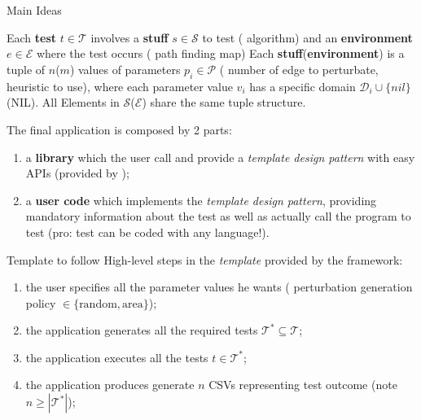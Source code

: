 \section*{}

\begin{frame}{Main Ideas}
    \begin{block}{\phantom{}}
    Each \textbf{test} $t \in \mathcal{T}$ involves a \textbf{stuff} $s \in \mathcal{S}$ to test (\eg{} algorithm) and an \textbf{environment} $e \in \mathcal{E}$ where the test occurs (\eg{} path finding map) Each \textbf{stuff}(\textbf{environment}) is a tuple of $n$($m$) values of parameters $p_i \in \mathcal{P}$ (\eg{} number of edge to perturbate, heuristic to use), where each parameter value $v_i$ has a specific domain $\mathcal{D}_{i} \cup \{nil \}$ (NIL). All Elements in $\mathcal{S}$($\mathcal{E}$) share the same tuple structure.
    \end{block}
    \vspace{-5pt}
    \begin{block}{\phantom{}}
        The final application is composed by 2 parts:
        \begin{enumerate}
            \item a \textbf{library} which the user call and provide a \textit{template design pattern} with easy APIs (provided by );
            \item a \textbf{user code} which implements the \textit{template design pattern}, providing mandatory information about the test as well as actually call the program to test (pro: test can be coded with any language!).
        \end{enumerate}
    \end{block}
    
\end{frame}

\begin{frame}{Template to follow}
    High-level steps in the \textit{template} provided by the framework:
    \begin{enumerate}
        \item the user specifies all the parameter values he wants (\eg{} perturbation generation policy $\in \{ \mbox{random}, \mbox{area} \}$);
        \item the application generates all the required tests $\mathcal{T}^{*} \subseteq \mathcal{T}$;
        \item the application executes all the tests $t \in \mathcal{T}^{*}$;
        \item the application produces generate $n$ CSVs representing test outcome (note $n \geq |\mathcal{T}^{*}|$);
    \end{enumerate}
\end{frame}

